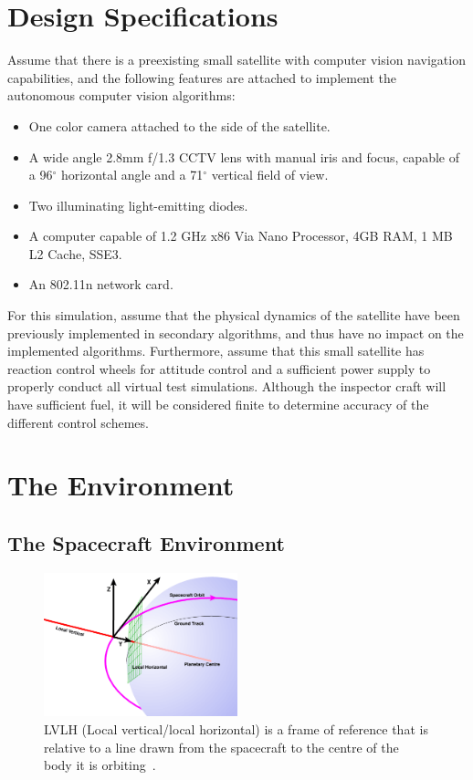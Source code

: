 \documentclass[journal, 10pt]{IEEEtran}
\begin{document}
\section{Design Specifications}
Assume that there is a preexisting small satellite with computer vision navigation capabilities, and the following features are attached to implement the autonomous computer vision algorithms:
\begin{itemize}
\item One color camera attached to the side of the satellite.
\item A wide angle 2.8mm f/1.3 CCTV lens with manual iris and focus, capable of a 96$^{\circ}$ horizontal angle and a 71$^{\circ}$ vertical field of view.
\item Two illuminating light-emitting diodes.
\item A computer capable of 1.2 GHz x86 Via Nano Processor, 4GB RAM, 1 MB L2 Cache, SSE3.
\item An 802.11n network card.
\end{itemize}
\cite{Vertigo2, Vertigo3, virt_sim, lens}

For this simulation, assume that the physical dynamics of the satellite have been previously implemented in secondary algorithms, and thus have no impact on the implemented algorithms. Furthermore, assume that this small satellite has reaction control wheels for attitude control and a sufficient power supply to properly conduct all virtual test simulations.  Although the inspector craft will have sufficient fuel, it will be considered finite to determine accuracy of the different control schemes.

\section{The Environment}
\subsection{The Spacecraft Environment}
\begin{figure}[tb]
\begin{center}
\includegraphics[width=0.5\textwidth]{figures/lvlh.png}
\caption{LVLH (Local vertical/local horizontal) is a frame of reference that is relative to a line drawn from the spacecraft to the centre of the body it is orbiting~\cite{lvlh}.}
\label{lvlh_diagram}
\end{center}
\end{figure}
\end{document}
